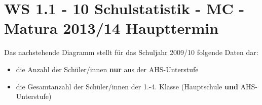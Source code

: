 \section{WS 1.1 - 10 Schulstatistik - MC - Matura 2013/14 Haupttermin}

\begin{beispiel}[WS 1.1]{1} %
			Das nachstehende Diagramm stellt für das Schuljahr 2009/10 folgende Daten dar:
			\begin{itemize}
				\item die Anzahl der Schüler/innen \textbf{nur} aus der AHS-Unterstufe
				\item die Gesamtanzahl der Schüler/innen der 1.-4. Klasse (Hauptschule \textbf{und} AHS-Unterstufe)
			\end{itemize}\leer
			

\end{beispiel}
